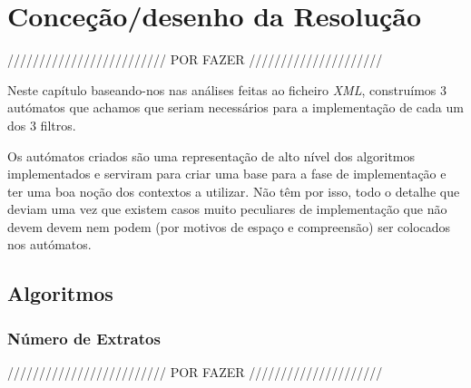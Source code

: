 \documentclass[11pt,a4paper]{report}
\begin{document}
\chapter{Conceção/desenho da Resolução}
\label{chap:concecao}

///////////////////////// POR FAZER /////////////////////

Neste capítulo baseando-nos nas análises feitas ao ficheiro \emph{XML}, construímos 3 autómatos que achamos que seriam necessários para a implementação de cada um dos 3 filtros.

Os autómatos criados são uma representação de alto nível dos algoritmos implementados e serviram para criar uma base para a fase de implementação e ter uma boa noção dos contextos a utilizar. Não têm por isso, todo o detalhe que deviam uma vez que existem casos muito peculiares de implementação que não devem devem nem podem (por motivos de espaço e compreensão) ser colocados nos autómatos.

\section{Algoritmos}
\subsection{Número de Extratos}

///////////////////////// POR FAZER /////////////////////
\end{document}
